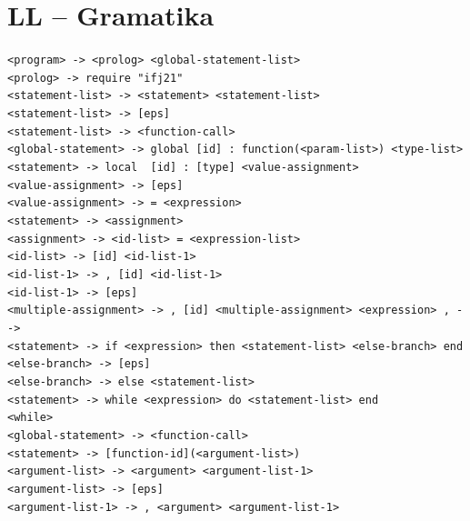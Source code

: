 \documentclass[11pt]{article}
\begin{document}
    \section{LL -- Gramatika}
        \verb|<program> -> <prolog> <global-statement-list>| \\
        \verb|<prolog> -> require "ifj21"| \\
        \verb|<statement-list> -> <statement> <statement-list>| \\
        \verb|<statement-list> -> [eps]| \\
        \verb|<statement-list> -> <function-call>| \\
        \verb|<global-statement> -> global [id] : function(<param-list>) <type-list>| \\
        \verb|<statement> -> local  [id] : [type] <value-assignment>| \\
        \verb|<value-assignment> -> [eps]| \\
        \verb|<value-assignment> -> = <expression>| \\
        \verb|<statement> -> <assignment>| \\
        \verb|<assignment> -> <id-list> = <expression-list>| \\
        \verb|<id-list> -> [id] <id-list-1>| \\
        \verb|<id-list-1> -> , [id] <id-list-1>| \\
        \verb|<id-list-1> -> [eps]| \\
        \verb|<multiple-assignment> -> , [id] <multiple-assignment> <expression> , -->| \\
        \verb|<statement> -> if <expression> then <statement-list> <else-branch> end| \\
        \verb|<else-branch> -> [eps]| \\
        \verb|<else-branch> -> else <statement-list>| \\
        \verb|<statement> -> while <expression> do <statement-list> end| \\
        \verb|<while>| \\
        \verb|<global-statement> -> <function-call>| \\
        \verb|<statement> -> [function-id](<argument-list>)| \\
        \verb|<argument-list> -> <argument> <argument-list-1>|  \\
        \verb|<argument-list> -> [eps]|  \\
        \verb|<argument-list-1> -> , <argument> <argument-list-1>| \\
\end{document}
